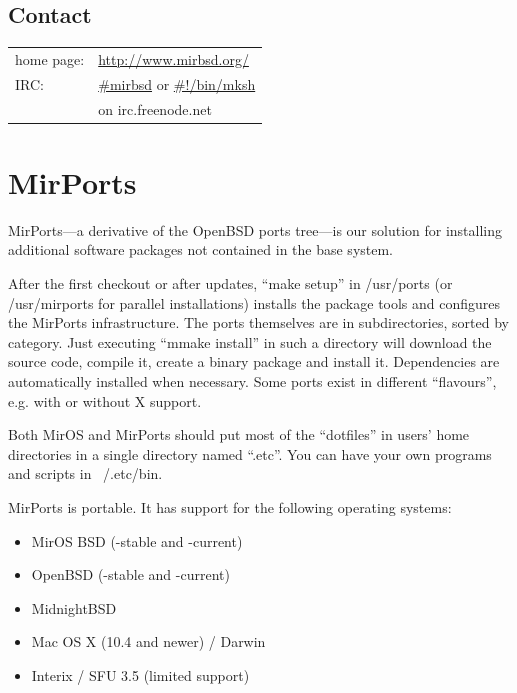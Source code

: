 \documentclass[a4paper,landscape,11pt,notumble]{leaflet}
\begin{document}
\subsection{Contact}
{\noindent\large
\begin{tabular}{ll}
home page: & \textcolor{darkred}{\url{http://www.mirbsd.org/}}\\
IRC: & \textcolor{darkred}{\url{#mirbsd}} or \textcolor{darkred}{\url{#!/bin/mksh}}\\
& on irc.freenode.net\\
\end{tabular}
\par}
\vspace{3ex}%
\graybox

\newpage

\section{MirPorts}

MirPorts---a derivative of the OpenBSD ports tree---is our solution for installing additional software packages not contained in the base system.

After the first checkout or after updates, “make setup” in /usr/ports (or /usr/mirports for parallel installations) installs the package tools and configures the MirPorts infrastructure. The ports themselves are in subdirectories, sorted by category. Just executing “mmake install” in such a directory will download the source code, compile it, create a binary package and install it. Dependencies are automatically installed when necessary. Some ports exist in different “flavours”, e.g. with or without X support.

Both MirOS and MirPorts should put most of the “dotfiles” in users’ home directories in a single directory named “.etc”. You can have your own programs and scripts in ~/.etc/bin.

MirPorts is portable. It has support for the following operating systems:

\begin{itemize}
\item MirOS BSD (-stable and -current)
\item OpenBSD (-stable and -current)
\item MidnightBSD
\item Mac OS X (10.4 and newer) / Darwin
\item Interix / SFU 3.5 (limited support)
\end{itemize}
\end{document}
